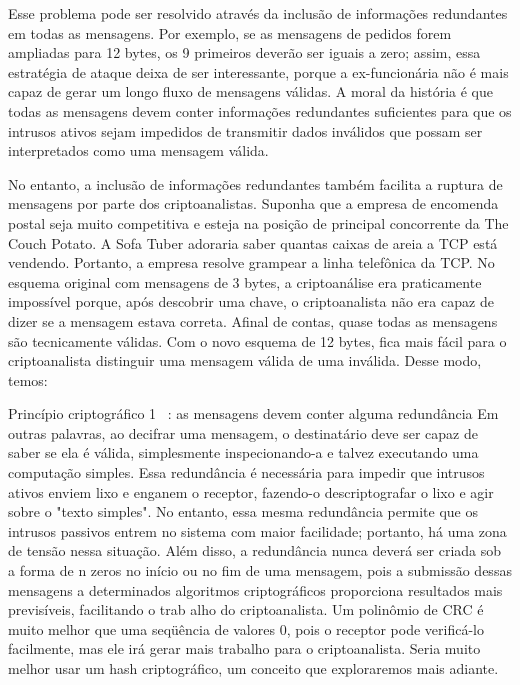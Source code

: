Esse problema pode ser resolvido através da inclusão de informações redundantes em todas as
mensagens. Por exemplo, se as mensagens de pedidos forem ampliadas para 12 bytes, os 9
primeiros deverão ser iguais a zero; assim, essa estratégia de ataque deixa de ser interessante,
porque a ex-funcionária não é mais capaz de gerar um longo fluxo de mensagens válidas. A moral
da história é que todas as mensagens devem conter informações redundantes suficientes para que
os intrusos ativos sejam impedidos de transmitir dados inválidos que possam ser interpretados
como uma mensagem válida.

No entanto, a inclusão de informações redundantes também facilita a ruptura de mensagens por
parte dos criptoanalistas. Suponha que a empresa de encomenda postal seja muito competitiva e
esteja na posição de principal concorrente da The Couch Potato. A Sofa Tuber adoraria saber
quantas caixas de areia a TCP está vendendo. Portanto, a empresa resolve grampear a linha
telefônica da TCP. No esquema original com mensagens de 3 bytes, a criptoanálise era
praticamente impossível porque, após descobrir uma chave, o criptoanalista não era capaz de dizer
se a mensagem estava correta. Afinal de contas, quase todas as mensagens são tecnicamente
válidas. Com o novo esquema de 12 bytes, fica mais fácil para o criptoanalista distinguir uma
mensagem válida de uma inválida. Desse modo, temos:

Princípio criptográfico 1 ~\cite{tanenbaum}: as mensagens devem conter alguma redundância
Em outras palavras, ao decifrar uma mensagem, o destinatário deve ser capaz de saber se ela é
válida, simplesmente inspecionando-a e talvez executando uma computação simples. Essa
redundância é necessária para impedir que intrusos ativos enviem lixo e enganem o receptor,
fazendo-o descriptografar o lixo e agir sobre o "texto simples". No entanto, essa mesma
redundância permite que os intrusos passivos entrem no sistema com maior facilidade; portanto,
há uma zona de tensão nessa situação. Além disso, a redundância nunca deverá ser criada sob a
forma de n zeros no início ou no fim de uma mensagem, pois a submissão dessas mensagens a
determinados algoritmos criptográficos proporciona resultados mais previsíveis, facilitando o trab
alho do criptoanalista. Um polinômio de CRC é muito melhor que uma seqüência de valores 0, pois
o receptor pode verificá-lo facilmente, mas ele irá gerar mais trabalho para o criptoanalista. Seria
muito melhor usar um hash criptográfico, um conceito que exploraremos mais adiante.

